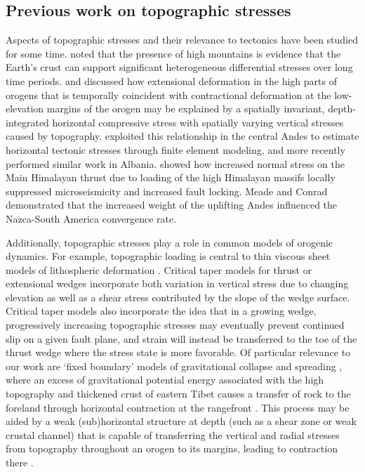 \documentclass[twocolumn,jgrga]{AGUTeX}
\begin{document}
\begin{article}
\subsection{Previous work on topographic
stresses}\label{previous-work-on-topographic-stresses}

Aspects of topographic stresses and their relevance to tectonics have
been studied for some time. \citet{jeffreys1924} noted that the
presence of high mountains is evidence that the Earth's crust can
support significant heterogeneous differential stresses over long time
periods. \citet{dalmayrac1981} and \citet{molnar1988} discussed how 
extensional deformation in
the high parts of orogens that is temporally coincident with contractional
deformation at the low-elevation margins of the orogen may be explained
by a spatially invariant, depth-integrated horizontal compressive stress
with spatially varying vertical stresses caused by topography.
\citet{richardson1994} exploited this
relationship in the central Andes to estimate horizontal tectonic
stresses through finite element modeling, and more recently 
\citet{copley2009} 
performed similar work in Albania. \citet{bollinger2004} showed how 
increased normal stress on the Main
Himalayan thrust due to loading of the high Himalayan massifs locally
suppressed microseismicity and increased fault locking. Meade and Conrad
\citet{meade2008} demonstrated that the increased weight of the
uplifting Andes influenced the Nazca-South America convergence rate.

Additionally, topographic stresses play a role in common models of
orogenic dynamics. For example, topographic loading is central to thin
viscous sheet models of lithospheric deformation \citep[e.g.,][]{birdpiper80,
flesch2010gpe}. Critical taper models for thrust or extensional
wedges \citep[e.g.,][]{dahlen1990, xiao1991} incorporate both variation in
vertical stress due to changing elevation as well as a shear stress
contributed by the slope of the wedge surface. Critical taper models
also incorporate the idea that in a growing wedge, progressively
increasing topographic stresses may eventually prevent continued slip on
a given fault plane, and strain will instead be transferred to the toe
of the thrust wedge where the stress state is more favorable. Of
particular relevance to our work are `fixed boundary' models of
gravitational collapse and spreading \citep{rey2001}, where an excess of
gravitational potential energy associated with the high topography and
thickened crust of eastern Tibet causes a transfer of rock to the
foreland through horizontal contraction at the rangefront \citep[e.g.,][]
{dewey1988, liuyang2003, copleymckenzie2007}. This process may be
aided by a weak (sub)horizontal structure at depth (such as a shear zone
or weak crustal channel) that is capable of transferring the vertical
and radial stresses from topography throughout an orogen to its margins,
leading to contraction there \citep[e.g.,][]{clark2005, burchfiel2008,
fleschbendick2012}.


\end{article}
\end{document}
